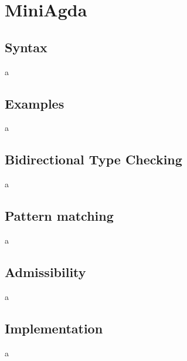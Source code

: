 \chapter{MiniAgda}
\section{Syntax}
a
\section{Examples}
a
\section{Bidirectional Type Checking}
a
\section{Pattern matching}
a
\section{Admissibility}
a
\section{Implementation}
a
